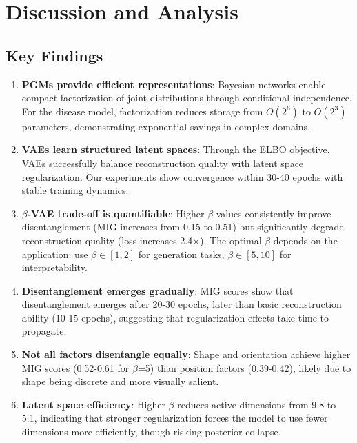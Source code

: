 \documentclass[conference]{IEEEtran}
\begin{document}
\section{Discussion and Analysis}

\subsection{Key Findings}

\begin{enumerate}
    \item \textbf{PGMs provide efficient representations}: Bayesian networks enable compact factorization of joint distributions through conditional independence. For the disease model, factorization reduces storage from $O(2^6)$ to $O(2^3)$ parameters, demonstrating exponential savings in complex domains.
    
    \item \textbf{VAEs learn structured latent spaces}: Through the ELBO objective, VAEs successfully balance reconstruction quality with latent space regularization. Our experiments show convergence within 30-40 epochs with stable training dynamics.
    
    \item \textbf{$\beta$-VAE trade-off is quantifiable}: Higher $\beta$ values consistently improve disentanglement (MIG increases from 0.15 to 0.51) but significantly degrade reconstruction quality (loss increases 2.4×). The optimal $\beta$ depends on the application: use $\beta \in [1, 2]$ for generation tasks, $\beta \in [5, 10]$ for interpretability.
    
    \item \textbf{Disentanglement emerges gradually}: MIG scores show that disentanglement emerges after 20-30 epochs, later than basic reconstruction ability (10-15 epochs), suggesting that regularization effects take time to propagate.
    
    \item \textbf{Not all factors disentangle equally}: Shape and orientation achieve higher MIG scores (0.52-0.61 for $\beta$=5) than position factors (0.39-0.42), likely due to shape being discrete and more visually salient.
    
    \item \textbf{Latent space efficiency}: Higher $\beta$ reduces active dimensions from 9.8 to 5.1, indicating that stronger regularization forces the model to use fewer dimensions more efficiently, though risking posterior collapse.
\end{enumerate}
\end{document}
